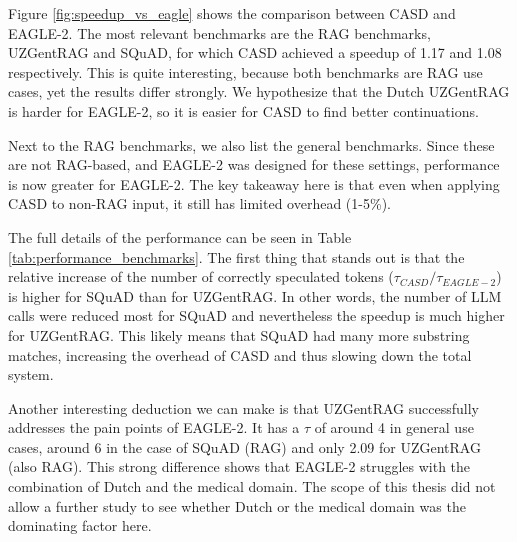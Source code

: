 Figure \ref{fig:speedup_vs_eagle} shows the comparison between CASD and EAGLE-2. The most relevant benchmarks are the RAG benchmarks, UZGentRAG and SQuAD, for which CASD achieved a speedup of 1.17 and 1.08 respectively. This is quite interesting, because both benchmarks are RAG use cases, yet the results differ strongly. We hypothesize that the Dutch UZGentRAG is harder for EAGLE-2, so it is easier for CASD to find better continuations.

Next to the RAG benchmarks, we also list the general benchmarks. Since these are not RAG-based, and EAGLE-2 was designed for these settings, performance is now greater for EAGLE-2. The key takeaway here is that even when applying CASD to non-RAG input, it still has limited overhead (1-5\%).

The full details of the performance can be seen in Table \ref{tab:performance_benchmarks}. The first thing that stands out is that the relative increase of the number of correctly speculated tokens ($\tau_{CASD} / \tau_{EAGLE-2}$) is higher for SQuAD than for UZGentRAG. In other words, the number of LLM calls were reduced most for SQuAD and nevertheless the speedup is much higher for UZGentRAG. This likely means that SQuAD had many more substring matches, increasing the overhead of CASD and thus slowing down the total system.

Another interesting deduction we can make is that UZGentRAG successfully addresses the pain points of EAGLE-2. It has a $\tau$ of around 4 in general use cases, around 6 in the case of SQuAD (RAG) and only 2.09 for UZGentRAG (also RAG). This strong difference shows that EAGLE-2 struggles with the combination of Dutch and the medical domain. The scope of this thesis did not allow a further study to see whether Dutch or the medical domain was the dominating factor here.

